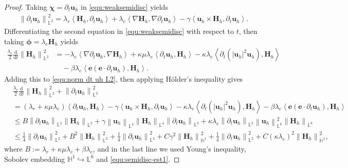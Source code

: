 \documentclass[11pt, reqno]{amsart}
\theoremstyle{definition}
\theoremstyle{remark}
\numberwithin{equation}{section}
\newcommand{\bff}{\boldsymbol}
\newcommand{\bb}{\mathbb}
\newcommand{\ddt}{\frac{\mathrm{d}}{\mathrm{d}t}}
\newcommand{\norm}[2]{\left\|{#1}\right\|_{#2}}
\newcommand{\inpro}[2]{\left\langle#1,#2\right\rangle}
\begin{document}
\begin{proof}
Taking $\bff{\chi}= \partial_t \bff{u}_h$ in \eqref{equ:weaksemidisc} yields
\begin{align}\label{equ:norm dt uh L2}
	\norm{\partial_t \bff{u}_h}{\bb{L}^2}^2 
	=
	\lambda_r \inpro{\bff{H}_h}{\partial_t \bff{u}_h}
	+
	\lambda_e \inpro{\nabla \bff{H}_h}{\nabla \partial_t \bff{u}_h}
	-
	\gamma \inpro{\bff{u}_h \times \bff{H}_h}{\partial_t \bff{u}_h}.
\end{align}
Differentiating the second equation in \eqref{equ:weaksemidisc} with respect to $t$, then taking $\bff{\phi}=\lambda_e \bff{H}_h$ yields
\begin{align*}
	\frac{\lambda_e}{2} \ddt \norm{\bff{H}_h}{\bb{L}^2}^2
	&=
	- \lambda_e
	\inpro{\nabla \partial_t \bff{u}_h}{\nabla \bff{H}_h}
	+
	\kappa\mu \lambda_e \inpro{\partial_t \bff{u}_h}{\bff{H}_h}
	-
	\kappa \lambda_e \inpro{\partial_t (|\bff{u}_h|^2 \bff{u}_h)}{\bff{H}_h}
	\\
	&\quad
	-
	\beta\lambda_e \inpro{\bff{e}(\bff{e}\cdot \partial_t \bff{u}_h)}{\bff{H}_h}.
\end{align*}
Adding this to \eqref{equ:norm dt uh L2}, then applying H\"{o}lder's inequality gives
\begin{align*} 
	&\frac{\lambda_e}{2} \ddt \norm{\bff{H}_h}{\bb{L}^2}^2
	+
	\norm{\partial_t \bff{u}_h}{\bb{L}^2}^2
	\\
	&=
	(\lambda_r + \kappa\mu \lambda_e) \inpro{\partial_t \bff{u}_h}{\bff{H}_h}
	-
	\gamma \inpro{\bff{u}_h \times \bff{H}_h}{\partial_t \bff{u}_h}
	-
	\kappa \lambda_e \inpro{\partial_t (|\bff{u}_h|^2 \bff{u}_h)}{\bff{H}_h}
	-
	\beta\lambda_e \inpro{\bff{e}(\bff{e}\cdot \partial_t \bff{u}_h)}{\bff{H}_h}
	\\
	&\leq
	B \norm{\partial_t \bff{u}_h}{\bb{L}^2}
	\norm{\bff{H}_h}{\bb{L}^2}
	+
	\gamma \norm{\bff{u}_h}{\bb{L}^4}
	\norm{\bff{H}_h}{\bb{L}^4}
	\norm{\partial_t \bff{u}_h}{\bb{L}^2}
	+
	\kappa\lambda_e \norm{\partial_t \bff{u}_h}{\bb{L}^2}
	\norm{\bff{u}_h}{\bb{L}^6}^2
	\norm{\bff{H}_h}{\bb{L}^6}
	\\
	&\leq
	\frac{1}{4} \norm{\partial_t \bff{u}_h}{\bb{L}^2}^2
	+
	B^2 \norm{\bff{H}_h}{\bb{L}^2}^2
	+
	\frac{1}{4} \norm{\partial_t \bff{u}_h}{\bb{L}^2}^2
	+
	C\gamma^2 \norm{\bff{H}_h}{\bb{H}^1}^2
	+
	\frac{1}{4} \norm{\partial_t \bff{u}_h}{\bb{L}^2}^2
	+
	C (\kappa \lambda_e)^2 \norm{\bff{H}_h}{\bb{H}^1}^2,
\end{align*}
where $B:=\lambda_r+\kappa\mu\lambda_e+\beta\lambda_e$, and in the last line we used Young's inequality, Sobolev embedding $\bb{H}^1\hookrightarrow \bb{L}^6$ and \eqref{equ:semidisc-est1}.

\end{proof}
\end{document}
